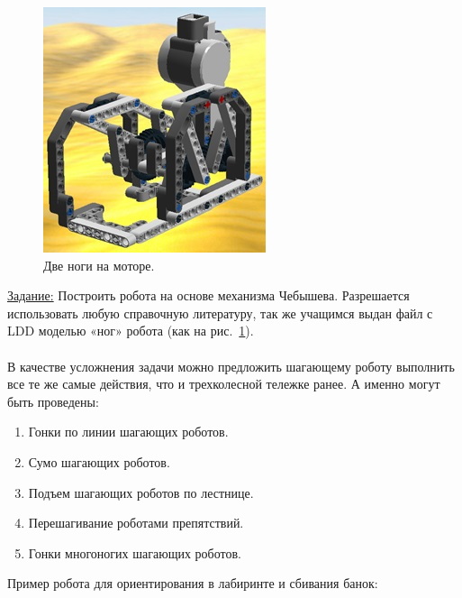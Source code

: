 \begin{figure}[h!]
	\begin{center}
		\includegraphics[width=0.67\linewidth]{chapters/chapter22/images/10}
		\caption{Две ноги на моторе.}
		\label{ris:image22x10}
	\end{center}
\end{figure}

\noindent\underline{Задание:} Построить робота на основе механизма Чебышева. Разрешается использовать любую справочную литературу, так же учащимся выдан файл с LDD моделью «ног» робота (как на рис.~\ref{ris:image22x10}).
\clearpage
{\hypertarget{lesson22x4}{}}\\\\

В качестве усложнения задачи можно предложить шагающему  роботу выполнить все те же самые действия, что и трехколесной тележке ранее. А именно могут быть проведены:

\begin{enumerate}
	\item Гонки по линии шагающих роботов. 
	\item Сумо шагающих роботов.
	\item Подъем шагающих роботов по лестнице.
	\item Перешагивание роботами препятствий.
	\item Гонки многоногих шагающих роботов.
\end{enumerate}

Пример робота для ориентирования в лабиринте и сбивания банок:

